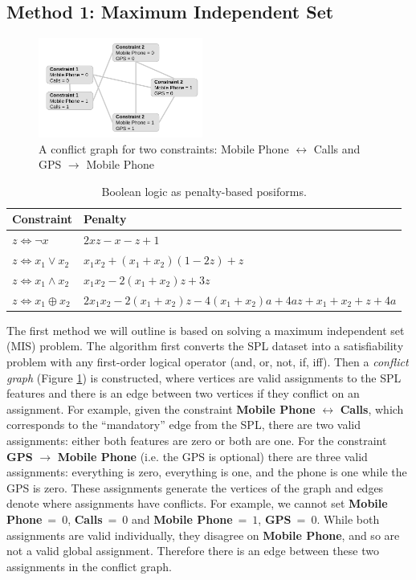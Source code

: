 \documentclass{sig-alternate-05-2015}
\begin{document}
\subsection{Method 1: Maximum Independent Set}
\begin{figure}[!h]
\centering
\includegraphics[width=0.48\textwidth]{images/mis}
\caption{A conflict graph for two constraints: Mobile Phone $\longleftrightarrow$ Calls and GPS $\to$ Mobile Phone}
\label{figure:mis}
\end{figure}

\begin{table}[!h]
\centering
\begin{tabular}{l l}
\toprule
Constraint & Penalty\\
\midrule
$z \iff \neg x$ & $2xz - x - z + 1$\\
$z \iff x_1 \lor x_2$ & $x_1 x_2 + (x_1 + x_2)(1-2z)+z$\\
$z \iff x_1 \land x_2$ & $x_1 x_2 - 2(x_1 + x_2)z + 3z$\\
$z \iff x_1 \oplus x_2$ & $2x_1x_2 - 2(x_1 + x_2)z - 4(x_1 + x_2)a + 4az + x_1 + x_2 + z + 4a$\\
\bottomrule
\end{tabular}
\label{table:gadgets}
\caption{Boolean logic as penalty-based posiforms.}
\end{table}

The first method we will outline is based on solving a maximum independent set (MIS) problem. The algorithm first converts the SPL dataset into a satisfiability problem with any first-order logical operator (and, or, not, if, iff). Then a \emph{conflict graph} (Figure \ref{figure:mis}) is constructed, where vertices are valid assignments to the SPL features and there is an edge between two vertices if they conflict on an assignment. For example, given the constraint \textbf{Mobile Phone} $\longleftrightarrow$ \textbf{Calls}, which corresponds to the ``mandatory'' edge from the SPL, there are two valid assignments: either both features are zero or both are one. For the constraint \textbf{GPS} $\to$ \textbf{Mobile Phone} (i.e. the GPS is optional) there are three valid assignments: everything is zero, everything is one, and the phone is one while the GPS is zero. These assignments generate the vertices of the
graph and edges denote where assignments have conflicts. For example, we cannot set \textbf{Mobile Phone}$~=~0$, \textbf{Calls}$~=~0$ and \textbf{Mobile Phone}$~=~1$, \textbf{GPS}$~=~0$. While both assignments are valid individually, they disagree on \textbf{Mobile Phone}, and so are not a valid global assignment. Therefore there is an edge between these two assignments in the conflict graph.
\end{document}
